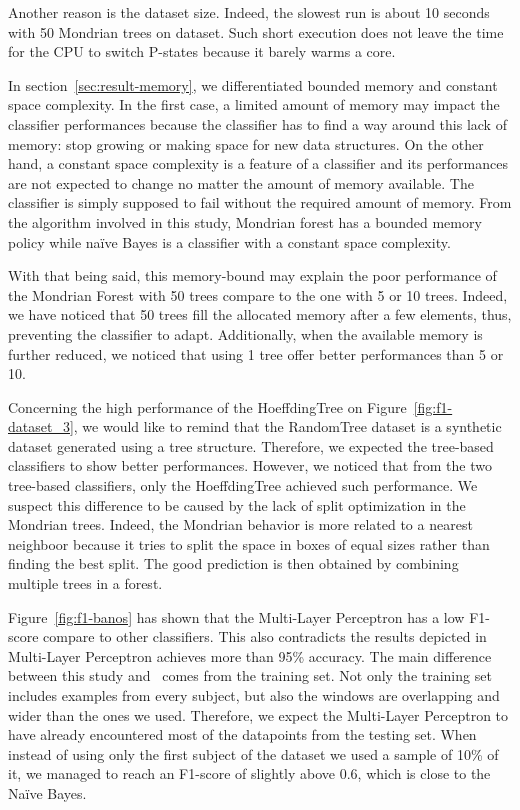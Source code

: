 Another reason is the dataset size. Indeed, the slowest run is about
10 seconds with 50 Mondrian trees on \recofitdataset dataset.  Such short
execution does not leave the time for the CPU to switch P-states because it
barely warms a core.

In section~\ref{sec:result-memory}, we differentiated bounded memory and
constant space complexity. In the first case, a limited amount of memory
may impact the classifier performances because the classifier has to find a way
around this lack of memory: stop growing or making space for new data structures.
On the other hand, a constant space complexity is a feature of a classifier and
its performances are not expected to change no  matter the amount of memory
available. The classifier is simply supposed to fail without the required
amount of memory. From the algorithm involved in this study, Mondrian forest
has a bounded memory policy while naïve Bayes is a classifier with a constant
space complexity.

With that being said, this memory-bound may explain the poor performance of the
Mondrian Forest with 50 trees compare to the one with 5 or 10 trees. Indeed, we
have noticed that 50 trees fill the allocated memory after a few elements,
thus, preventing the classifier to adapt. Additionally, when the available
memory is further reduced, we noticed that using 1 tree offer better
performances than 5 or 10. 

Concerning the high performance of the HoeffdingTree on
Figure~\ref{fig:f1-dataset_3}, we would like to remind that the RandomTree
dataset is a synthetic dataset generated using a tree structure. Therefore, we
expected the tree-based classifiers to show better performances.  However, we
noticed that from the two tree-based classifiers, only the HoeffdingTree
achieved such performance.  We suspect this difference to be caused by the lack
of split optimization in the Mondrian trees. Indeed, the Mondrian behavior is
more related to a nearest neighboor because it tries to split the space in
boxes of equal sizes rather than finding the best split. The good prediction is
then obtained by combining multiple trees in a forest.

Figure~\ref{fig:f1-banos} has shown that the Multi-Layer Perceptron has a low
F1-score compare to other classifiers. This also contradicts the results
depicted in~\cite{omid_2019} Multi-Layer Perceptron achieves more than 95\% 
accuracy. The main difference between this study and~\cite{omid_2019} comes
from the training set. Not only the training set includes examples from every
subject, but also the windows are overlapping and wider than the ones we used.
Therefore, we expect the Multi-Layer Perceptron to have already encountered
most of the datapoints from the testing set. When instead of using only the
first subject of the \banosdataset dataset we used a sample of 10\% of it, we
managed to reach an F1-score of slightly above 0.6, which is close to the Naïve
Bayes.

